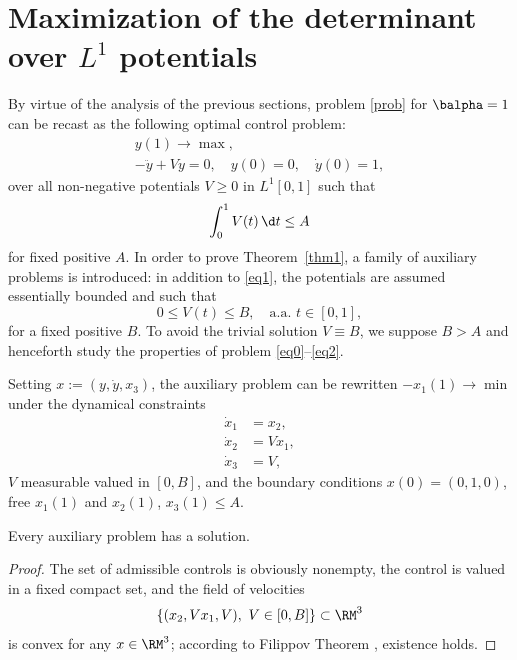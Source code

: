 \section{Maximization of the determinant over \texorpdfstring{$L^1$}{L1} potentials}\label{s3}
By virtue of the analysis of the previous sections, problem \eqref{prob} for
$\balpha=1$ can be recast as the following optimal control problem:
\begin{gather} \label{eq0}
y(1) \to \max,\\
\label{eq1}
-\ddot{y}+Vy=0,\quad y(0)=0,\quad \dot{y}(0)=1,
\end{gather}
over all non-negative potentials $V \geq 0$ in $L^1[0,1]$ such that
\begin{equation} \label{eq1a}
\int_0^1 V(t)\,\d t \leq A
\end{equation}
for fixed positive $A$.
In order to prove Theorem~\ref{thm1},
a family of auxiliary problems is introduced: in addition to \eqref{eq1}, the
potentials are assumed essentially bounded and such that
\begin{equation} \label{eq2}
0 \leq V(t) \leq B,\quad \text{a.a.\ }t \in [0,1],
\end{equation}
for a fixed positive $B$. To avoid the trivial solution $V \equiv B$, we
suppose $B>A$ and henceforth study the properties of problem \eqref{eq0}--\eqref{eq2}.

Setting $x:=(y,\dot{y},x_3)$, the auxiliary problem can be rewritten $-x_1(1) \to \min$
under the dynamical constraints
\begin{align} \label{eq4a}
\dot{x}_1 &= x_2,\\
\dot{x}_2 &= Vx_1,\\
\dot{x}_3 &= V, \label{eq4c}
\end{align}
$V$ measurable valued in $[0,B]$,
and the boundary conditions $x(0)=(0,1,0)$, free $x_1(1)$ and $x_2(1)$, $x_3(1) \leq A$.

\begin{prop} Every auxiliary problem has a solution.
\end{prop}
\begin{proof} The set of admissible controls is obviously nonempty, the control is
valued in a fixed compact set, and the field of velocities
\[
\{ (x_2,Vx_1,V),\ V \in [0,B] \} \subset \RM^3
\]
is convex for any $x \in \RM^3$; according to Filippov Theorem \cite{agrachev-2004a},
existence holds.\end{proof}

